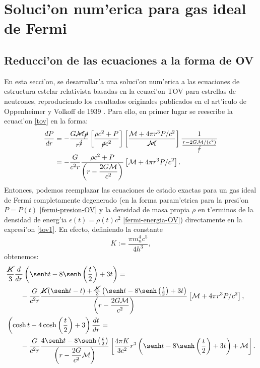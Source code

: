 \section{Soluci'on num'erica para gas ideal de Fermi}
\subsection{Reducci'on de las ecuaciones a la forma de OV}
En esta secci'on, se desarrollar'a una soluci'on num'erica a las ecuaciones de estructura estelar relativista basadas en la ecuaci'on TOV para estrellas de neutrones, reproduciendo los resultados originales publicados en el art'iculo de  Oppenheimer y Volkoff de 1939 \cite{Oppenheimer39enero}. Para ello, en primer lugar se reescribe la ecuaci'on  \eqref{tov} en la forma:
\begin{align}
\frac{dP}{dr}&=-\frac{G\cancel{\mathcal{M}}\cancel{\rho}}{r^{\cancel{2}}}\left[\frac{\rho c^2+P}{\cancel{\rho} c^2}\right]\left[ \frac{\mathcal{M}+4\pi r^3P/c^2}{\cancel{\mathcal{M}}}\right]\frac{1}{\frac{r-2G\mathcal{M}/(c^2)}{\cancel{r}}}\\
&=-\frac{G}{c^2r}\frac{\rho c^2+P}{\left(r-\dfrac{2G\mathcal{M}}{c^2}\right)}\left[\mathcal{M}+4\pi r^3P/c^2\right].\label{tov1}
\end{align}
Entonces, podemos reemplazar las ecuaciones de estado exactas para un gas ideal de Fermi completamente degenerado (en la forma param'etrica para la presi'on $P=P(t)$ \eqref{fermi-presion-OV} y la densidad de masa propia $\rho$ en t'erminos de la densidad de energ'ia $\epsilon(t)=\rho(t) c^2$ \eqref{fermi-energia-OV})  directamente en la expresi'on \eqref{tov1}. En efecto, definiendo la constante
\begin{equation}\label{fermi-rel-k}
 K:=\frac{\pi m_{n}^4 c^5}{4h^3},
\end{equation}
obtenemos:
\begin{align}
&\frac{\cancel{K}}{3}\frac{d}{dr}\left(\senh t-8\senh \left(\frac{t}{2}\right)+3t\right)= \nonumber \\
&\qquad -\frac{G}{c^2r}\frac{\cancel{K}(\senh t-t)+\frac{\cancel{K}}{3}\left(\senh t-8\senh \left(\frac{t}{2}\right)+3t\right)}{\left(r-\dfrac{2G\mathcal{M}}{c^2}\right)}\left[\mathcal{M}+4\pi r^3P/c^2\right],\\
%
&\left(\cosh t-4\cosh \left(\frac{t}{2}\right)+3\right)\frac{dt}{dr}=\\
&\qquad -\frac{G}{c^2r}\frac{4\senh t-8\senh\left(\frac{t}{2}\right)}{\left(r-\dfrac{2G}{c^2}\mathcal{M}\right)}\left[\frac{4\pi K}{3c^2} r^3\left(\senh t-8\senh \left(\frac{t}{2}\right)+3t\right)+\mathcal{M}\right].
\end{align}
